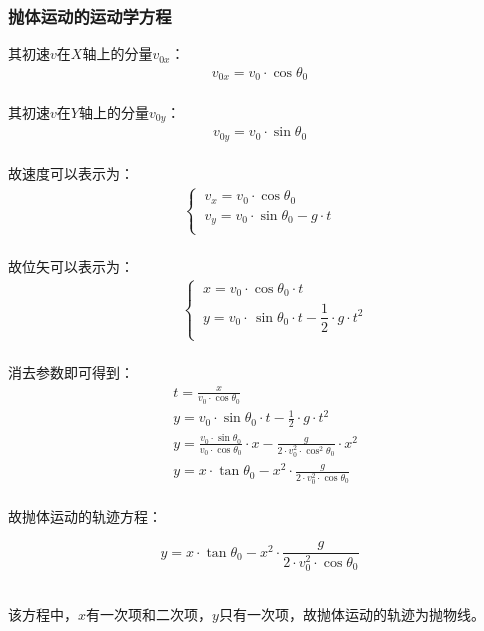 \documentclass[UTF8]{ctexart}
\begin{document}
\newpage

\subsubsection{抛体运动的运动学方程}
    \setcounter{equation}{0}
    其初速$v$在$X$轴上的分量$v_{0x}$：
    \begin{align}
        v_{0x}=v_0\cdot\cos{\theta_0}
    \end{align}\\
    其初速$v$在$Y$轴上的分量$v_{0y}$：
    \begin{align}
        v_{0y}=v_0\cdot\sin{\theta_0}
    \end{align}\\
    故速度可以表示为：
    \begin{align}
        \begin{cases}
            ~v_x=v_0\cdot\cos{\theta_0}\\[1mm]
            ~v_y=v_0\cdot\sin{\theta_0}-g\cdot t\\[1mm]
        \end{cases}
    \end{align}\\
    故位矢可以表示为：
    \begin{align}
        ~~~~~~~~~~
        \begin{cases}
            ~x=v_0\cdot\cos{\theta_0}\cdot t\\[1mm]
            ~y=v_0\cdot\,\sin{\theta_0}\cdot t-\dfrac{1}{2}\cdot g\cdot t^2\\[1mm]
        \end{cases}
    \end{align}\\
    消去参数即可得到：
    \begin{align}
        &t=\frac{x}{v_0\cdot\cos{\theta_0}}\\[5mm]
        &y=v_0\cdot\sin{\theta_0}\cdot t-\frac{1}{2}\cdot g\cdot t^2\\[5mm]
        &y=\frac{v_0\cdot\sin{\theta_0}}{v_0\cdot\cos{\theta_0}}\cdot x-\frac{g}{2\cdot v_0^2\cdot\cos^2{\theta_0}}\cdot x^2\\[5mm]
        &y=x\cdot\tan{\theta_0}-x^2\cdot\frac{g}{2\cdot v_0^2\cdot\cos{\theta_0}}
    \end{align}\\
    故抛体运动的轨迹方程：
    \begin{large}
        \begin{equation*}
            y=x\cdot\tan{\theta_0}-x^2\cdot\frac{g}{2\cdot v_0^2\cdot\cos{\theta_0}}
        \end{equation*}
    \end{large}\\
    该方程中，$x$有一次项和二次项，$y$只有一次项，故抛体运动的轨迹为抛物线。
\end{document}
